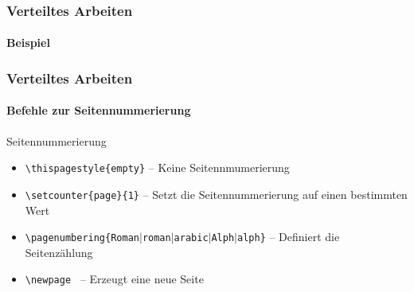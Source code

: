 

\begin{frame}
\frametitle{Verteiltes Arbeiten}
\framesubtitle{Beispiel}




\end{frame}




\begin{frame}
\frametitle{Verteiltes Arbeiten}
\framesubtitle{Befehle zur Seitennummerierung}
\begin{block}{Seitennummerierung}
\begin{itemize}
\item \texttt{\color{nounibaredI}\textbackslash thispagestyle\color{black}\{empty\}} -- Keine Seitennmumerierung
\item \texttt{\color{nounibaredI}\textbackslash setcounter\color{black}\{page\}\{1\}} -- Setzt die Seitennummerierung auf einen bestimmten Wert
\item \texttt{\color{nounibaredI}\textbackslash pagenumbering\color{black}\{Roman$\mid$roman$\mid$arabic$\mid$Alph$\mid$alph\}} -- Definiert die Seitenz\"ahlung
\item \texttt{\color{nounibaredI}\textbackslash newpage \color{black}} -- Erzeugt eine neue Seite
\end{itemize}
\end{block}
\end{frame}
